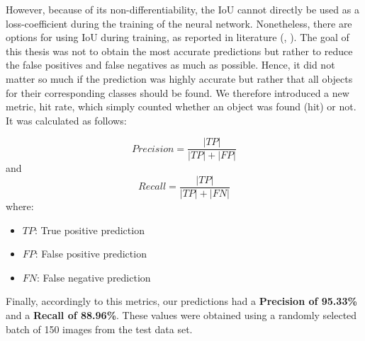 However, because of its non-differentiability, the IoU cannot directly be used as a loss-coefficient during the training of the neural network. Nonetheless, there are options for using IoU during training, as reported in literature (\cite{Bebis.2016}, \cite{Yu.20160804}).
The goal of this thesis was not to obtain the most accurate predictions but rather to reduce the false positives and false negatives as much as possible. Hence, it did not matter so much if the prediction was highly accurate but rather that all objects for their corresponding classes should be found. We therefore introduced a new metric, hit rate, which simply counted whether an object was found (hit) or not. It was calculated as follows:

\begin{equation}
	Precision = \dfrac{|TP|}{|TP| + |FP|}
\end{equation}
and
\begin{equation}
	Recall = \dfrac{|TP|}{|TP| + |FN|}
\end{equation}
where:
\begin{itemize}[label=]
    \item $TP$: True positive prediction
    \item $FP$: False positive prediction
    \item $FN$: False negative prediction
\end{itemize}

Finally, accordingly to this metrics, our predictions had a \textbf{Precision of 95.33\%} and a \textbf{Recall of 88.96\%}. These values were obtained using a randomly selected batch of 150 images from the test data set.

